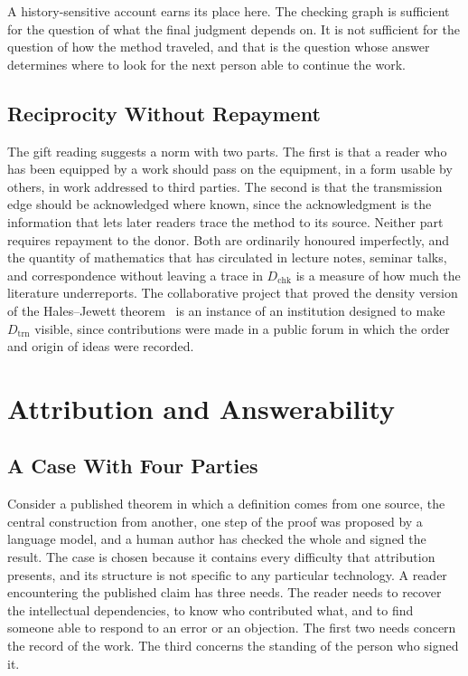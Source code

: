 \documentclass[11pt]{book}
\theoremstyle{definition}
\theoremstyle{remark}
\begin{document}
A history-sensitive account earns its place here. The checking graph is sufficient for the question of what the final judgment depends on. It is not sufficient for the question of how the method traveled, and that is the question whose answer determines where to look for the next person able to continue the work.

\section{Reciprocity Without Repayment}

The gift reading suggests a norm with two parts. The first is that a reader who has been equipped by a work should pass on the equipment, in a form usable by others, in work addressed to third parties. The second is that the transmission edge should be acknowledged where known, since the acknowledgment is the information that lets later readers trace the method to its source. Neither part requires repayment to the donor. Both are ordinarily honoured imperfectly, and the quantity of mathematics that has circulated in lecture notes, seminar talks, and correspondence without leaving a trace in $D_{\mathrm{chk}}$ is a measure of how much the literature underreports. The collaborative project that proved the density version of the Hales--Jewett theorem~\cite{polymath} is an instance of an institution designed to make $D_{\mathrm{trn}}$ visible, since contributions were made in a public forum in which the order and origin of ideas were recorded.

\chapter{Attribution and Answerability}

\section{A Case With Four Parties}

Consider a published theorem in which a definition comes from one source, the central construction from another, one step of the proof was proposed by a language model, and a human author has checked the whole and signed the result. The case is chosen because it contains every difficulty that attribution presents, and its structure is not specific to any particular technology. A reader encountering the published claim has three needs. The reader needs to recover the intellectual dependencies, to know who contributed what, and to find someone able to respond to an error or an objection. The first two needs concern the record of the work. The third concerns the standing of the person who signed it.
\end{document}
